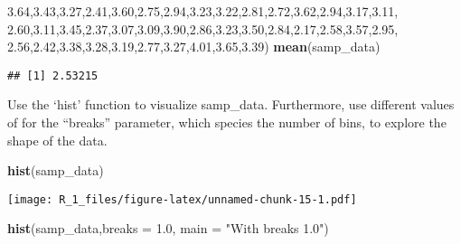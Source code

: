 \documentclass[
]{article}
\newenvironment{Shaded}{\begin{snugshade}}{\end{snugshade}}
\newcommand{\AttributeTok}[1]{\textcolor[rgb]{0.13,0.29,0.53}{#1}}
\newcommand{\FloatTok}[1]{\textcolor[rgb]{0.00,0.00,0.81}{#1}}
\newcommand{\FunctionTok}[1]{\textcolor[rgb]{0.13,0.29,0.53}{\textbf{#1}}}
\newcommand{\NormalTok}[1]{#1}
\newcommand{\StringTok}[1]{\textcolor[rgb]{0.31,0.60,0.02}{#1}}
\begin{document}
\begin{Shaded}
\begin{Highlighting}[]
               \FloatTok{3.64}\NormalTok{,}\FloatTok{3.43}\NormalTok{,}\FloatTok{3.27}\NormalTok{,}\FloatTok{2.41}\NormalTok{,}\FloatTok{3.60}\NormalTok{,}\FloatTok{2.75}\NormalTok{,}\FloatTok{2.94}\NormalTok{,}\FloatTok{3.23}\NormalTok{,}\FloatTok{3.22}\NormalTok{,}\FloatTok{2.81}\NormalTok{,}\FloatTok{2.72}\NormalTok{,}\FloatTok{3.62}\NormalTok{,}\FloatTok{2.94}\NormalTok{,}\FloatTok{3.17}\NormalTok{,}\FloatTok{3.11}\NormalTok{,}
               \FloatTok{2.60}\NormalTok{,}\FloatTok{3.11}\NormalTok{,}\FloatTok{3.45}\NormalTok{,}\FloatTok{2.37}\NormalTok{,}\FloatTok{3.07}\NormalTok{,}\FloatTok{3.09}\NormalTok{,}\FloatTok{3.90}\NormalTok{,}\FloatTok{2.86}\NormalTok{,}\FloatTok{3.23}\NormalTok{,}\FloatTok{3.50}\NormalTok{,}\FloatTok{2.84}\NormalTok{,}\FloatTok{2.17}\NormalTok{,}\FloatTok{2.58}\NormalTok{,}\FloatTok{3.57}\NormalTok{,}\FloatTok{2.95}\NormalTok{,}
               \FloatTok{2.56}\NormalTok{,}\FloatTok{2.42}\NormalTok{,}\FloatTok{3.38}\NormalTok{,}\FloatTok{3.28}\NormalTok{,}\FloatTok{3.19}\NormalTok{,}\FloatTok{2.77}\NormalTok{,}\FloatTok{3.27}\NormalTok{,}\FloatTok{4.01}\NormalTok{,}\FloatTok{3.65}\NormalTok{,}\FloatTok{3.39}\NormalTok{)}
\FunctionTok{mean}\NormalTok{(samp\_data)}
\end{Highlighting}
\end{Shaded}

\begin{verbatim}
## [1] 2.53215
\end{verbatim}

Use the `hist' function to visualize samp\_data. Furthermore, use
different values of for the ``breaks'' parameter, which species the
number of bins, to explore the shape of the data.

\begin{Shaded}
\begin{Highlighting}[]
  \FunctionTok{hist}\NormalTok{(samp\_data)}
\end{Highlighting}
\end{Shaded}

\texttt{[image: R\_1\_files/figure-latex/unnamed-chunk-15-1.pdf]}

\begin{Shaded}
\begin{Highlighting}[]
  \FunctionTok{hist}\NormalTok{(samp\_data,}\AttributeTok{breaks =} \FloatTok{1.0}\NormalTok{, }\AttributeTok{main =} \StringTok{"With breaks 1.0"}\NormalTok{)}
\end{Highlighting}
\end{Shaded}
\end{document}
